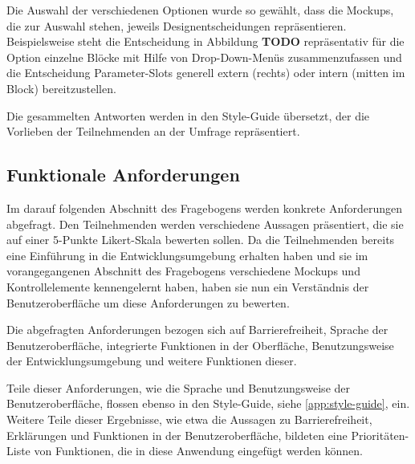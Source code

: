 Die Auswahl der verschiedenen Optionen wurde so gewählt, dass die Mockups, die zur Auswahl stehen, jeweils Designentscheidungen repräsentieren. Beispielsweise steht die Entscheidung in Abbildung \textbf{TODO} repräsentativ für die Option einzelne Blöcke mit Hilfe von Drop-Down-Menüs zusammenzufassen und die Entscheidung Parameter-Slots generell extern (rechts) oder intern (mitten im Block) bereitzustellen. %

Die gesammelten Antworten werden in den Style-Guide übersetzt, der die Vorlieben der Teilnehmenden an der Umfrage repräsentiert.

%

\subsection{Funktionale Anforderungen}
Im darauf folgenden Abschnitt des Fragebogens werden konkrete Anforderungen abgefragt. Den Teilnehmenden werden verschiedene Aussagen präsentiert, die sie auf einer 5-Punkte Likert-Skala bewerten sollen. Da die Teilnehmenden bereits eine Einführung in die Entwicklungsumgebung erhalten haben und sie im vorangegangenen Abschnitt des Fragebogens verschiedene Mockups und Kontrollelemente kennengelernt haben, haben sie nun ein Verständnis der Benutzeroberfläche um diese Anforderungen zu bewerten. %

Die abgefragten Anforderungen bezogen sich auf Barrierefreiheit, Sprache der Benutzeroberfläche, integrierte Funktionen in der Oberfläche, Benutzungsweise der Entwicklungsumgebung und weitere Funktionen dieser.

Teile dieser Anforderungen, wie die Sprache und Benutzungsweise der Benutzeroberfläche, flossen ebenso in den Style-Guide, siehe \ref{app:style-guide}, ein. Weitere Teile dieser Ergebnisse, wie etwa die Aussagen zu Barrierefreiheit, Erklärungen und Funktionen in der Benutzeroberfläche, bildeten eine Prioritäten-Liste von Funktionen, die in diese Anwendung eingefügt werden können.

